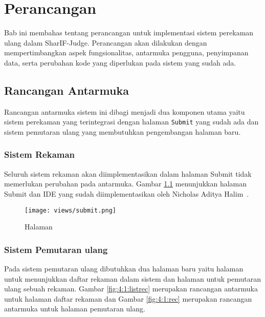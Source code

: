 \chapter{Perancangan}
\label{chap:perancangan}

Bab ini membahas tentang perancangan untuk implementasi sistem perekaman ulang dalam SharIF-Judge. Perancangan akan dilakukan dengan mempertimbangkan aspek fungsionalitas, antarmuka pengguna, penyimpanan data, serta perubahan kode yang diperlukan pada sistem yang sudah ada.

\section{Rancangan Antarmuka}

Rancangan antarmuka sistem ini dibagi menjadi dua komponen utama yaitu sistem perekaman yang terintegrasi dengan halaman \verb|Submit| yang sudah ada dan sistem pemutaran ulang yang membutuhkan pengembangan halaman baru.

\subsection{Sistem Rekaman}
\label{sub:4:1:rekaman}

Seluruh sistem rekaman akan diimplementasikan dalam halaman Submit tidak memerlukan perubahan pada antarmuka. Gambar \ref{fig:4:1:submit} menunjukkan halaman Submit dan IDE yang sudah diimplementasikan oleh Nicholas Aditya Halim~\cite{nicholas:sharif}.

\vspace{0.75cm}

\begin{figure}[H]
    \centering
    \texttt{[image: views/submit.png]}
    \caption{Halaman}
    \label{fig:4:1:submit}
\end{figure}

\subsection{Sistem Pemutaran ulang}
\label{sub:4:1:pemutaranulang}

Pada sistem pemutaran ulang dibutuhkan dua halaman baru yaitu halaman untuk menunjukkan daftar rekaman dalam sistem dan halaman untuk pemutaran ulang sebuah rekaman. Gambar \ref{fig:4:1:listrec} merupakan rancangan antarmuka untuk halaman daftar rekaman dan Gambar \ref{fig:4:1:rec} merupakan rancangan antarmuka untuk halaman pemutaran ulang.

